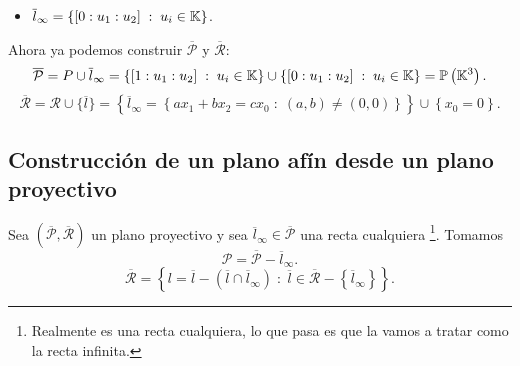 \begin{eg}
\begin{itemize}
	\item $\displaystyle \overline{l}_{\infty} = \left\{ [0 : u_{1} : u_{2}] \; : \; u_{i} \in \mathbb{K}\right\}  $.
\end{itemize}
Ahora ya podemos construir $\displaystyle \overline{\mathcal{P}} $ y $\displaystyle \overline{\mathcal{R}} $:
\[\overline{\mathcal{P}} = P \cup \overline{l}_{\infty} = \left\{ [1 : u_{1} : u_{2}] \; : \; u_{i} \in \mathbb{K}\right\} \cup \left\{ [0 : u_{1} : u_{2}] \; : \; u_{i} \in \mathbb{K}\right\} = \mathbb{P}\left(\mathbb{K}^{3}\right).\]
\[\overline{\mathcal{R}} = \mathcal{R} \cup \{\overline{l}\} = \left\{ \overline{l}_{\infty} = \left\{ ax_{1} + bx_{2} = cx_{0} \; : \; \left(a,b\right) \neq \left(0,0\right)\right\} \right\} \cup \left\{ x_{0} = 0\right\}  .\]

\end{eg}
 
\subsection{Construcción de un plano afín desde un plano proyectivo}
Sea $\displaystyle \left(\overline{\mathcal{P}}, \overline{\mathcal{R}}\right) $ un plano proyectivo y sea $\displaystyle \overline{l}_{\infty} \in \overline{\mathcal{P}} $ una recta cualquiera \footnote{Realmente es una recta cualquiera, lo que pasa es que la vamos a tratar como la recta infinita.}. Tomamos 
\[ \mathcal{P} = \overline{\mathcal{P}}  - \overline{l}_{\infty}.\]
\[ \overline{\mathcal{R}} = \left\{ l = \overline{l} - \left(\overline{l} \cap \overline{l}_{\infty}\right) \; : \; \overline{l} \in \overline{\mathcal{R}} - \left\{ \overline{l}_{\infty}\right\} \right\}.\]

